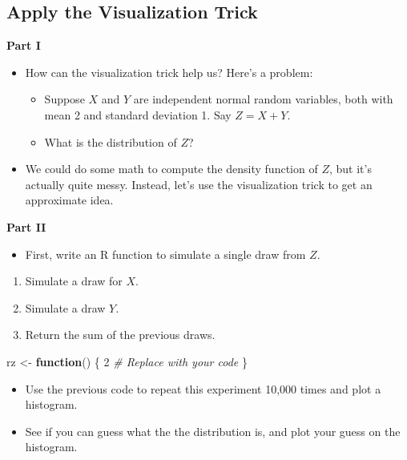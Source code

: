 \documentclass[
]{book}
\newenvironment{Shaded}{\begin{snugshade}}{\end{snugshade}}
\newcommand{\CommentTok}[1]{\textcolor[rgb]{0.56,0.35,0.01}{\textit{#1}}}
\newcommand{\ControlFlowTok}[1]{\textcolor[rgb]{0.13,0.29,0.53}{\textbf{#1}}}
\newcommand{\DecValTok}[1]{\textcolor[rgb]{0.00,0.00,0.81}{#1}}
\newcommand{\NormalTok}[1]{#1}
\newcommand{\OtherTok}[1]{\textcolor[rgb]{0.56,0.35,0.01}{#1}}
\providecommand{\tightlist}{%
  \setlength{\itemsep}{0pt}\setlength{\parskip}{0pt}}
\theoremstyle{definition}
\theoremstyle{definition}
\theoremstyle{definition}
\theoremstyle{definition}
\theoremstyle{remark}
\begin{document}
\hypertarget{apply-the-visualization-trick}{%
\subsection{Apply the Visualization Trick}\label{apply-the-visualization-trick}}

\textbf{Part I}

\begin{itemize}
\item
  How can the visualization trick help us? Here's a problem:

  \begin{itemize}
  \tightlist
  \item
    Suppose \(X\) and \(Y\) are independent normal random variables, both with mean 2 and standard deviation 1. Say \(Z = X + Y\).\\
  \item
    What is the distribution of \(Z\)?
  \end{itemize}
\item
  We could do some math to compute the density function of \(Z\), but it's actually quite messy. Instead, let's use the visualization trick to get an approximate idea.
\end{itemize}

\textbf{Part II}

\begin{itemize}
\tightlist
\item
  First, write an R function to simulate a single draw from \(Z\).
\end{itemize}

\begin{enumerate}
\def\labelenumi{\arabic{enumi}.}
\tightlist
\item
  Simulate a draw for \(X\).
\item
  Simulate a draw \(Y\).
\item
  Return the sum of the previous draws.
\end{enumerate}

\begin{Shaded}
\begin{Highlighting}[]
\NormalTok{rz }\OtherTok{\textless{}{-}} \ControlFlowTok{function}\NormalTok{() \{}
  \DecValTok{2} \CommentTok{\# Replace with your code}
\NormalTok{\}}
\end{Highlighting}
\end{Shaded}

\begin{itemize}
\tightlist
\item
  Use the previous code to repeat this experiment 10,000 times and plot a histogram.
\item
  See if you can guess what the the distribution is, and plot your guess on the histogram.
\end{itemize}
\end{document}
